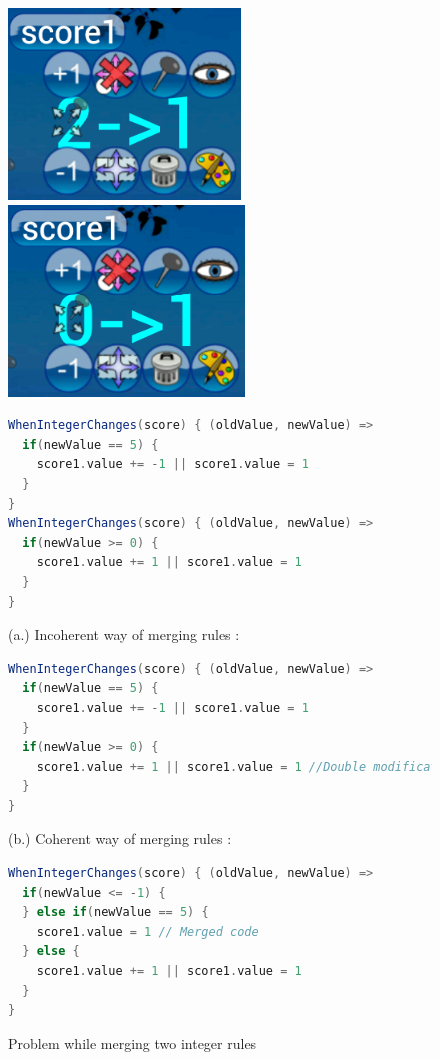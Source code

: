 \documentclass[12pt]{article} %
\begin{document}
\begin{figure}
\includegraphics[height=2in]{captures/score2to1}
\includegraphics[height=2in]{captures/score0to1}

\begin{lstlisting}[language=scala]
WhenIntegerChanges(score) { (oldValue, newValue) =>
  if(newValue == 5) {
    score1.value += -1 || score1.value = 1
  }
}
WhenIntegerChanges(score) { (oldValue, newValue) =>
  if(newValue >= 0) {
    score1.value += 1 || score1.value = 1
  }
}
\end{lstlisting}

(a.) Incoherent way of merging rules :
\begin{lstlisting}[language=scala]
WhenIntegerChanges(score) { (oldValue, newValue) =>
  if(newValue == 5) {
    score1.value += -1 || score1.value = 1
  }
  if(newValue >= 0) {
    score1.value += 1 || score1.value = 1 //Double modification /!\
  }
}
\end{lstlisting}

(b.) Coherent way of merging rules :
\begin{lstlisting}[language=scala]
WhenIntegerChanges(score) { (oldValue, newValue) =>
  if(newValue <= -1) {
  } else if(newValue == 5) {
    score1.value = 1 // Merged code
  } else {
    score1.value += 1 || score1.value = 1
  }
}
\end{lstlisting}
\caption{Problem while merging two integer rules\label{differentrules}}
\end{figure}
\end{document}
